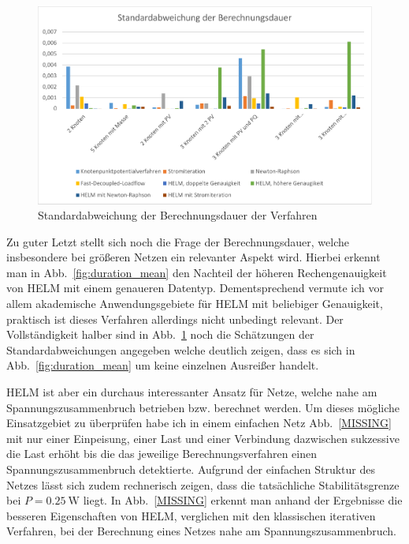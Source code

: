 \documentclass[12pt,a4paper]{article}
\newcommand{\reffig}[1]{{Abb.~\ref{#1}}}
\begin{document}
	\begin{figure}
		\centering
		\includegraphics[scale=0.8]{pictures/duration_deviation}
		\caption{Standardabweichung der Berechnungsdauer der Verfahren}
		\label{fig:duration_deviation}
	\end{figure}
	
	Zu guter Letzt stellt sich noch die Frage der Berechnungsdauer, welche insbesondere bei größeren Netzen ein relevanter Aspekt wird. Hierbei erkennt man in \reffig{fig:duration_mean} den Nachteil der höheren Rechengenauigkeit von HELM mit einem genaueren Datentyp. Dementsprechend vermute ich vor allem akademische Anwendungsgebiete für HELM mit beliebiger Genauigkeit, praktisch ist dieses Verfahren allerdings nicht unbedingt relevant. Der Vollständigkeit halber sind in \reffig{fig:duration_deviation} noch die Schätzungen der Standardabweichungen angegeben welche deutlich zeigen, dass es sich in \reffig{fig:duration_mean} um keine einzelnen Ausreißer handelt.
	
	HELM ist aber ein durchaus interessanter Ansatz für Netze, welche nahe am Spannungszusammenbruch betrieben bzw. berechnet werden. Um dieses mögliche Einsatzgebiet zu überprüfen habe ich in einem einfachen Netz \reffig{MISSING} mit nur einer Einpeisung, einer Last und einer Verbindung dazwischen sukzessive die Last erhöht bis die das jeweilige Berechnungsverfahren einen Spannungszusammenbruch detektierte. Aufgrund der einfachen Struktur des Netzes lässt sich zudem rechnerisch zeigen, dass die tatsächliche Stabilitätsgrenze bei $P = \SI{0.25}{\watt}$ liegt. In \reffig{MISSING} erkennt man anhand der Ergebnisse die besseren Eigenschaften von HELM, verglichen mit den klassischen iterativen Verfahren, bei der Berechnung eines Netzes nahe am Spannungszusammenbruch.
	
\end{document}
